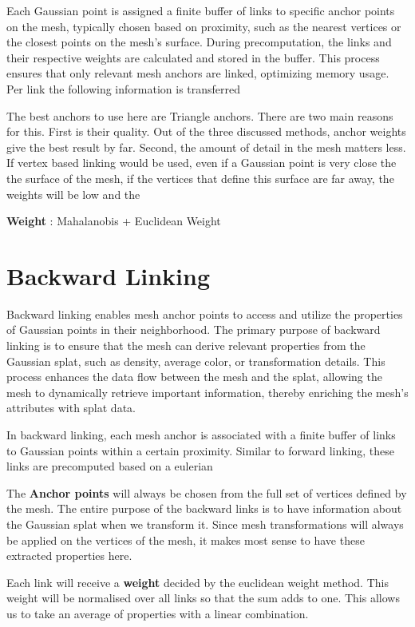 Each Gaussian point is assigned a finite buffer of links to specific anchor points on the mesh, typically chosen based on proximity, such as the nearest vertices or the closest points on the mesh's surface. During precomputation, the links and their respective weights are calculated and stored in the buffer. This process ensures that only relevant mesh anchors are linked, optimizing memory usage. Per link the following information is transferred

The best anchors to use here are Triangle anchors. There are two main reasons for this. First is their quality. Out of the three discussed methods, anchor weights give the best result by far. Second, the amount of detail in the mesh matters less. If vertex based linking would be used, even if a Gaussian point is very close the the surface of the mesh, if the vertices that define this surface are far away, the weights will be low and the 

\textbf{Weight} : Mahalanobis + Euclidean Weight

\section{Backward Linking}

Backward linking enables mesh anchor points to access and utilize the properties of Gaussian points in their neighborhood. The primary purpose of backward linking is to ensure that the mesh can derive relevant properties from the Gaussian splat, such as density, average color, or transformation details. This process enhances the data flow between the mesh and the splat, allowing the mesh to dynamically retrieve important information, thereby enriching the mesh’s attributes with splat data.

In backward linking, each mesh anchor is associated with a finite buffer of links to Gaussian points within a certain proximity. Similar to forward linking, these links are precomputed based on a eulerian

The \textbf{Anchor points} will always be chosen from the full set of vertices defined by the mesh. The entire purpose of the backward links is to have information about the Gaussian splat when we transform it. Since mesh transformations will always be applied on the vertices of the mesh, it makes most sense to have these extracted properties here.

Each link will receive a \textbf{weight} decided by the euclidean weight method. This weight will be normalised over all links so that the sum adds to one. This allows us to take an average of properties with a linear combination.